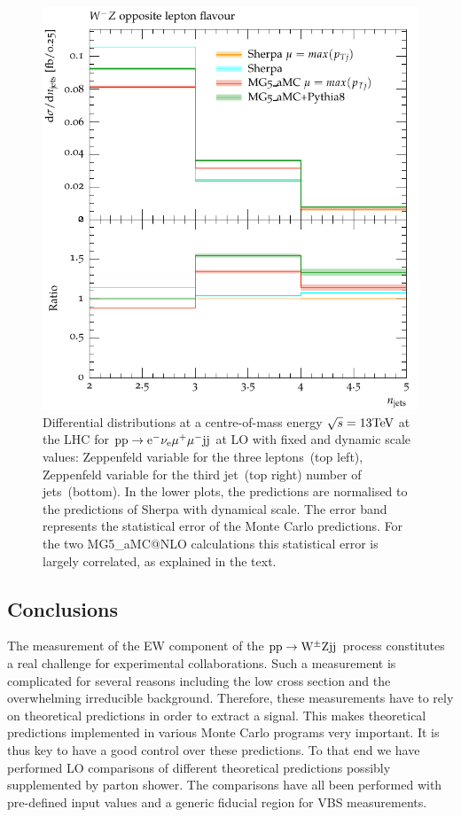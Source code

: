 \documentclass[11pt]{cernrep}
\makeatletter
\newcommand{\MGaMC}{M\protect\scalebox{0.8}{AD}G\protect\scalebox{0.8}{RAPH}5\_aMC@NLO\xspace}
\makeatother
\begin{document}
\begin{figure}[htbp]
\begin{center}
   \includegraphics[scale=0.65]{figs/dyn_WmZ_OF_nJets}
\caption{Differential distributions at a centre-of-mass energy $\sqrt{s}=13{\rm TeV}$ at the LHC for ${\rm p} {\rm p} \to {\rm e}^-  \nu_{\rm e}  \mu^+ \mu^- {\rm j} {\rm j}$ at LO with fixed and dynamic scale values: 
                Zeppenfeld variable for the three leptons~(top left),
                Zeppenfeld variable for the third jet~(top right)
                number of jets~(bottom).
                In the lower plots, the predictions are normalised to the predictions of {\sc Sherpa} with dynamical scale. The error band represents
                the statistical error of the Monte Carlo predictions. For the two \MGaMC
                calculations this statistical error is largely correlated, as explained in the text.}
\label{vbs_fig_shower_2b}
\end{center}
\end{figure}

\subsection{Conclusions \label{vbs_concl}}

The measurement of the EW component of the ${\rm p}{\rm p} \to {\rm W}^{\pm}{\rm Z}{\rm j}{\rm j}$ process constitutes a real challenge for experimental collaborations.
Such a measurement is complicated for several reasons including the low cross section and the overwhelming irreducible background.
Therefore, these measurements have to rely on theoretical predictions in order to extract a signal.
This makes theoretical predictions implemented in various Monte Carlo programs very important.
It is thus key to have a good control over these predictions.
To that end we have performed LO comparisons of different theoretical predictions possibly supplemented by parton shower.
The comparisons have all been performed with pre-defined input values and a generic fiducial region for VBS measurements.
\end{document}
